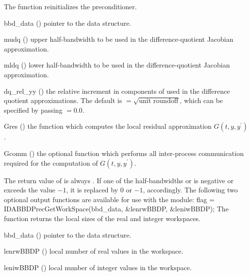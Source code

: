 {
  The function  reinitializes the {\idabbdpre} preconditioner.
}
{
  \begin{args}[dq\_rel\_yy]
  \item[bbd\_data] ()
    pointer to the {\idabbdpre} data structure.
  \item[mudq] ()
    upper half-bandwidth to be used in the difference-quotient Jacobian approximation.
  \item[mldq] ()
    lower half-bandwidth to be used in the difference-quotient Jacobian approximation.
  \item[dq\_rel\_yy] ()
    the relative increment in components of  used in the difference quotient
    approximations.  
    The default is  $= \sqrt{\text{unit roundoff}}$, which
    can be specified by passing  $= 0.0$.
  \item[Gres] ()
    the {\C} function which computes the local residual approximation 
    $G(t,y,y^\prime)$.
  \item[Gcomm] ()
    the optional {\C} function which performs all inter-process communication required
    for the computation of $G(t,y,y^\prime)$.
  \end{args}
}
{
  The return value of  is always .
}
{
  If one of the half-bandwidths  or  is negative or
  exceeds the value $-1$, it is replaced by 0 or $-1$,
  accordingly.
}
The following two optional output functions are available for use with
the {\idabbdpre} module:
{
  flag = IDABBDPrecGetWorkSpace(bbd\_data, \&lenrwBBDP, \&leniwBBDP);
}
{
  The function  returns the local sizes
  of the {\idabbdpre} real and integer workspaces.
}
{
  \begin{args}[lenrwBBDP]
  \item[bbd\_data] ()
    pointer to the {\idabbdpre} data structure.
  \item[lenrwBBDP] ()
    local number of real values in the {\idabbdpre} workspace.
  \item[leniwBBDP] ()
    local number of integer values in the {\idabbdpre} workspace.
  \end{args}
}
